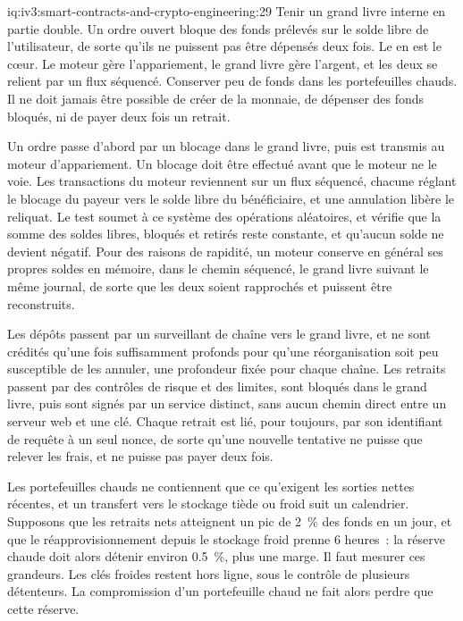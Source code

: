 \begin{solution}{iq:iv3:smart-contracts-and-crypto-engineering:29}
Tenir un grand livre interne en partie double. Un ordre ouvert bloque des fonds prélevés sur le solde libre de l'utilisateur, de sorte qu'ils ne puissent pas être dépensés deux fois. Le  en est le cœur. Le moteur gère l'appariement, le grand livre gère l'argent, et les deux se relient par un flux séquencé. Conserver peu de fonds dans les portefeuilles chauds. Il ne doit jamais être possible de créer de la monnaie, de dépenser des fonds bloqués, ni de payer deux fois un retrait.
\label{lst:iv3:cr:holds}

Un ordre passe d'abord par un blocage dans le grand livre, puis est transmis au moteur d'appariement. Un blocage doit être effectué avant que le moteur ne le voie. Les transactions du moteur reviennent sur un flux séquencé, chacune réglant le blocage du payeur vers le solde libre du bénéficiaire, et une annulation libère le reliquat. Le test soumet à ce système des opérations aléatoires, et vérifie que la somme des soldes libres, bloqués et retirés reste constante, et qu'aucun solde ne devient négatif. Pour des raisons de rapidité, un moteur conserve en général ses propres soldes en mémoire, dans le chemin séquencé, le grand livre suivant le même journal, de sorte que les deux soient rapprochés et puissent être reconstruits.

Les dépôts passent par un surveillant de chaîne vers le grand livre, et ne sont crédités qu'une fois suffisamment profonds pour qu'une réorganisation soit peu susceptible de les annuler, une profondeur fixée pour chaque chaîne. Les retraits passent par des contrôles de risque et des limites, sont bloqués dans le grand livre, puis sont signés par un service distinct, sans aucun chemin direct entre un serveur web et une clé. Chaque retrait est lié, pour toujours, par son identifiant de requête à un seul nonce, de sorte qu'une nouvelle tentative ne puisse que relever les frais, et ne puisse pas payer deux fois.

Les portefeuilles chauds ne contiennent que ce qu'exigent les sorties nettes récentes, et un transfert vers le stockage tiède ou froid suit un calendrier. Supposons que les retraits nets atteignent un pic de 2~\% des fonds en un jour, et que le réapprovisionnement depuis le stockage froid prenne 6 heures~: la réserve chaude doit alors détenir environ 0.5~\%, plus une marge. Il faut mesurer ces grandeurs. Les clés froides restent hors ligne, sous le contrôle de plusieurs détenteurs. La compromission d'un portefeuille chaud ne fait alors perdre que cette réserve.


\end{solution}
